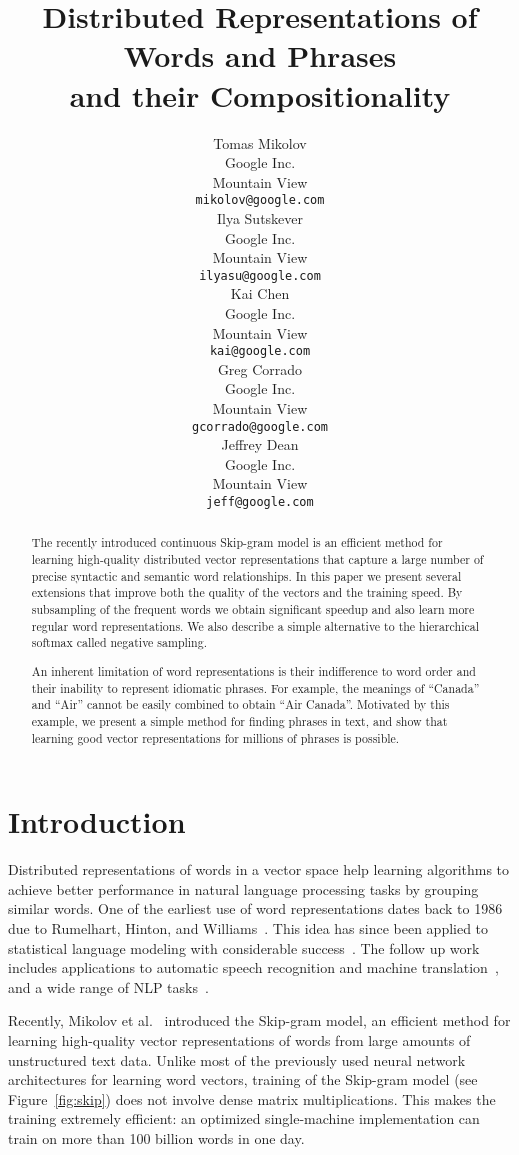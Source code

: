 \documentclass{article}
\title{Distributed Representations of Words and Phrases \\ and their Compositionality}
\author{
Tomas Mikolov\\
Google Inc.\\
Mountain View \\
\texttt{mikolov@google.com} \\
\And
Ilya Sutskever \\
Google Inc. \\
Mountain View \\
\texttt{ilyasu@google.com} \\
\And
Kai Chen \\
Google Inc. \\
Mountain View \\
\texttt{kai@google.com} \\
\And
Greg Corrado \\
Google Inc. \\
Mountain View \\
\texttt{gcorrado@google.com} \\
\And
Jeffrey Dean \\
Google Inc. \\
Mountain View \\
\texttt{jeff@google.com}}
\begin{document}
\maketitle
\begin{abstract}

The recently introduced continuous Skip-gram model is an
efficient method for learning high-quality distributed vector representations that
capture a large number of precise syntactic and semantic word
relationships. In this paper we present several extensions that improve both
the quality of the vectors and the training speed.
By subsampling of the frequent words we obtain significant speedup
and also learn more regular word representations. We also describe a simple
alternative to the hierarchical softmax called negative sampling.

An inherent limitation of word representations is their indifference
to word order and their inability to represent idiomatic phrases.  For
example, the meanings of ``Canada'' and ``Air'' cannot be easily
combined to obtain ``Air Canada''.  Motivated by
this example, we present a simple method for finding
phrases in text, and show that learning good vector
representations for millions of phrases is possible.

\end{abstract}

\section{Introduction}

Distributed representations of words in a vector space
help learning algorithms to achieve
better performance in natural language processing tasks by grouping
 similar words. One of the earliest use of word representations
dates back to 1986 due to Rumelhart, Hinton, and Williams~\cite{nature}.
This idea has since been applied to statistical language modeling with considerable
success~\cite{bengio_lm}. The follow up work includes
applications to automatic speech recognition and machine translation~\cite{Schwenk,mikolov4},
and a wide range of NLP tasks~\cite{collobert,wsabie,socher,bengio_sentiment,turney,turney2,linreg}.

Recently, Mikolov et al.~\cite{mikolov} introduced the Skip-gram
model, an efficient method for learning high-quality vector
representations of words from large amounts of unstructured text data.
Unlike most of the previously used neural network architectures
for learning word vectors, training of the Skip-gram model (see Figure~\ref{fig:skip})
does not involve dense matrix multiplications. This makes the training
extremely efficient: an optimized single-machine implementation can train
on more than 100 billion words in one day.
\end{document}
